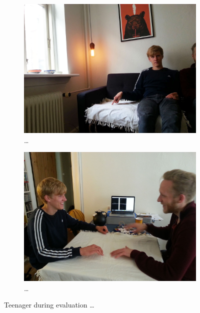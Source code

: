\begin{figure}
        \begin{subfigure}[b]{0.45\textwidth}
                \centering
                \includegraphics[width=\textwidth]{figures/touch/evaluation/sebastian/sofa_infront_seb}
                \caption{\dots}
                \label{fig:textiletouch:eval:sebastian:sofa_front}
        \end{subfigure}
        \begin{subfigure}[b]{0.45\textwidth}
                \centering
                \includegraphics[width=\textwidth]{figures/touch/evaluation/sebastian/table}
                \caption{\dots}
                \label{fig:textiletouch:eval:sebastian:table}
        \end{subfigure}
        \caption{Teenager during evaluation \dots}
        \label{fig:textiletouch:eval:sebastian}
\end{figure}

